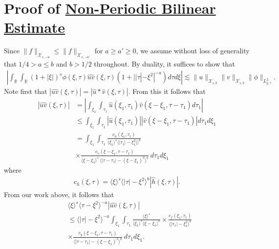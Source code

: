 \documentclass[12pt,reqno]{amsart}
\numberwithin{equation}{section}  %
\newcommand{\rr}{\mathbb{R}}
\newcommand{\wh}{\widehat}
\begin{document}
\section{Proof of \hyperref[prop:bilin-est-real]{Non-Periodic Bilinear Estimate}} 
%
\label{sec:bilin-est-real}
Since $\| f \|_{\mathcal{X}_{s,-a}} \le \| f \|_{\mathcal{X}_{s, -a'}}$ for $a \ge a' \ge 0$, we assume
without loss of generality that $1/4 > a \le b$ and $b > 1/2$ throughout. 
By duality, it suffices to show that 
%
\begin{equation}
	\label{duality-est-real}
	\begin{split}
    |	\int_{\rr} \int_{\rr} (1 + |\xi|)^{s}
		\phi(\xi, \tau) \wh{uv}(\xi, \tau)(1 
    + | |\tau| - \xi^{2} |^{-a}) d \tau d \xi | \lesssim \|u\|_{\mathcal{X}_{s,b}}
    \|v\|_{\mathcal{X}_{s,b}}
    \|\phi \|_{L^{2}_{\xi, \tau}}.
	\end{split}
\end{equation}
Note first that $|\wh{uv}(\xi, \tau) |  = | \wh{u} *  \wh{v} 
(\xi, \tau)|$. From this it follows that
%
%
\begin{equation}
	\label{non-lin-rep-real}
	\begin{split}
		| \wh{uv}(\xi, \tau)|
    & = | \int_{\xi_{1}}  \int_{\tau_{1}}
    \wh{u}\left( \xi_1,  \tau_1 \right) \wh{v}\left( \xi - \xi_1 , \tau - \tau_1   
\right) d \tau_1 |
\\
& \le  \int_{\xi_{1}}  \int_{\tau_{1}}
    |\wh{u}\left( \xi_1,  \tau_1 \right)| |\wh{v}\left( \xi - \xi_1 , \tau - \tau_1   
    \right)| d \tau_1 d \xi_{1}
\\
& = \int_{\xi_1 } \int_{\tau_{1}} \frac{c_u\left( \xi_1, \tau_1 
\right)}{\langle \xi_1 \rangle ^s \langle |\tau_1| - \xi_1^{2} | \rangle ^{b}}
\\
& \times \frac{c_{v}\left( \xi - \xi_1, \tau - \tau_1 \right)}{\langle \xi -
\xi_1 \rangle ^s\ \langle |\tau - \tau_1 | -  (\xi - \xi_1)^{2} \rangle^{b}}
\ d \tau_1 d \xi_{1}
\end{split}
\end{equation}
%
%
where 
\begin{equation*}
	\begin{split}
		c_h(\xi, \tau) =
			\langle \xi \rangle ^s \langle |\tau| - \xi^{2} \rangle ^{b} | \wh{h}\left( \xi, \tau \right) |.
	\end{split}
\end{equation*}
%
%
From our work above, it follows that 
%
%
\begin{equation}
	\label{convo-est-starting-pnt-real}
	\begin{split}
		 & \langle \xi \rangle^s \langle \tau - \xi^{2} \rangle^{-a} | \wh{uv}\left( 
		\xi, \tau \right) |
		\\
		& \le \langle |\tau| - \xi^{2} \rangle^{-a}
    \int_{\xi_1 } \int_{\tau_{1}} \frac{\langle \xi \rangle^{s}}{\langle \xi_1 \rangle^s
    \langle \xi - \xi_1 \rangle^s} 
		\times \frac{c_f(\xi_1, \tau_1)}{\langle |\tau_1| - \xi_1^{2} \rangle ^{b}}
		\\
		& \times
		\frac{c_g(\xi - \xi_1, \tau - \tau_1 )}{\langle |\tau - \tau_1| - (\xi - \xi_1)^{2}
    \rangle^{b}}\ d \tau_1 d \xi_{1}.
	\end{split}
\end{equation}
\end{document}
